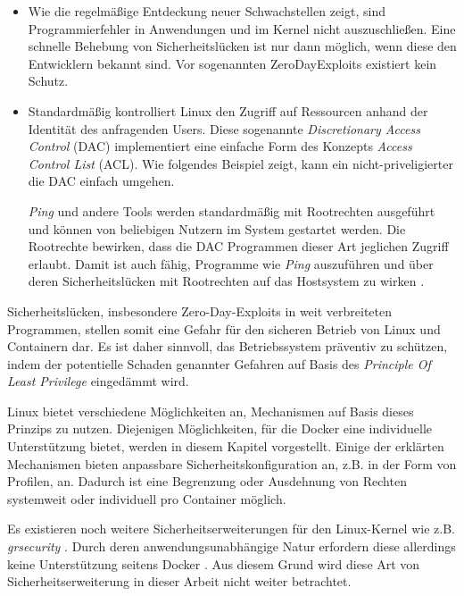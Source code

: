 \documentclass[../main.tex]{subfiles}
\begin{document}
		\begin{itemize}
			\item	Wie die regelmäßige Entdeckung neuer Schwachstellen zeigt, sind Programmierfehler in Anwendungen und im Kernel nicht auszuschließen. Eine schnelle Behebung von Sicherheitslücken ist nur dann möglich, wenn diese den Entwicklern bekannt sind. Vor sogenannten \glspl{ZeroDayExploit} existiert kein Schutz.
			\item	Standardmäßig kontrolliert Linux den Zugriff auf Ressourcen anhand der Identität des anfragenden Users. Diese sogenannte \emph{Discretionary Access Control} (\acrshort{DAC}) implementiert eine einfache Form des Konzepts \emph{Access Control List} (\acrshort{ACL}). Wie folgendes Beispiel zeigt, kann ein nicht-priveligierter \cbroken{} die DAC einfach umgehen.

			\emph{Ping} und andere Tools werden standardmäßig mit Rootrechten ausgeführt und können von beliebigen Nutzern im System gestartet werden. Die Rootrechte bewirken, dass die DAC Programmen dieser Art jeglichen Zugriff erlaubt. Damit ist auch \cbroken{} fähig, Programme wie \emph{Ping} auszuführen und über deren Sicherheitslücken mit Rootrechten auf das Hostsystem zu wirken \cite[S.26]{SELinuxApparmor}.
		\end{itemize}

		Sicherheitslücken, insbesondere Zero-Day-Exploits in weit verbreiteten Programmen, stellen somit eine Gefahr für den sicheren Betrieb von Linux und Containern dar. Es ist daher sinnvoll, das Betriebssystem präventiv zu schützen, indem der potentielle Schaden genannter Gefahren auf Basis des \emph{Principle Of Least Privilege} eingedämmt wird.

		Linux bietet verschiedene Möglichkeiten an, Mechanismen auf Basis dieses Prinzips zu nutzen. Diejenigen Möglichkeiten, für die Docker eine individuelle Unterstützung bietet, werden in diesem Kapitel vorgestellt. Einige der erklärten Mechanismen bieten anpassbare Sicherheitskonfiguration an, z.B. in der Form von Profilen, an. Dadurch ist eine Begrenzung oder Ausdehnung von Rechten systemweit oder individuell pro Container möglich.

		Es existieren noch weitere Sicherheitserweiterungen für den Linux-Kernel wie z.B. \emph{grsecurity} \cite{grsecurity}. Durch deren anwendungsunabhängige Natur erfordern diese allerdings keine Unterstützung seitens Docker \cite{dockerSecurity}. Aus diesem Grund wird diese Art von Sicherheitserweiterung in dieser Arbeit nicht weiter betrachtet.
\end{document}

